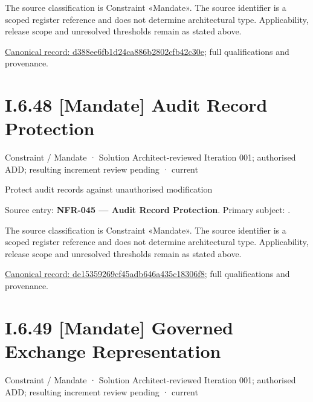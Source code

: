 The source classification is Constraint «Mandate». The source identifier is a scoped register reference and does not determine architectural type. Applicability, release scope and unresolved thresholds remain as stated above.


{\footnotesize \href{../../../../../../../../continuum/motivation/constraint/mandate/d388ee6fb1d24ca886b2802cfb42c30e.md}{Canonical record: d388ee6fb1d24ca886b2802cfb42c30e}; full qualifications and provenance.}\par
\section*{I.6.48 [Mandate] Audit Record Protection}
\label{navigation:I.6.48}

\label{element:de15359269cf45adb646a435c18306f8}
{\small Constraint / Mandate · Solution Architect-reviewed Iteration 001; authorised ADD; resulting increment review pending · current}\par

Protect audit records against unauthorised modification



Source entry: \textbf{NFR-045 — Audit Record Protection}. Primary subject: \texttt{}.



The source classification is Constraint «Mandate». The source identifier is a scoped register reference and does not determine architectural type. Applicability, release scope and unresolved thresholds remain as stated above.


{\footnotesize \href{../../../../../../../../continuum/motivation/constraint/mandate/de15359269cf45adb646a435c18306f8.md}{Canonical record: de15359269cf45adb646a435c18306f8}; full qualifications and provenance.}\par
\section*{I.6.49 [Mandate] Governed Exchange Representation}
\label{navigation:I.6.49}

\label{element:e9d06b3fe6b744cc86bd2a136e02165a}
{\small Constraint / Mandate · Solution Architect-reviewed Iteration 001; authorised ADD; resulting increment review pending · current}\par

